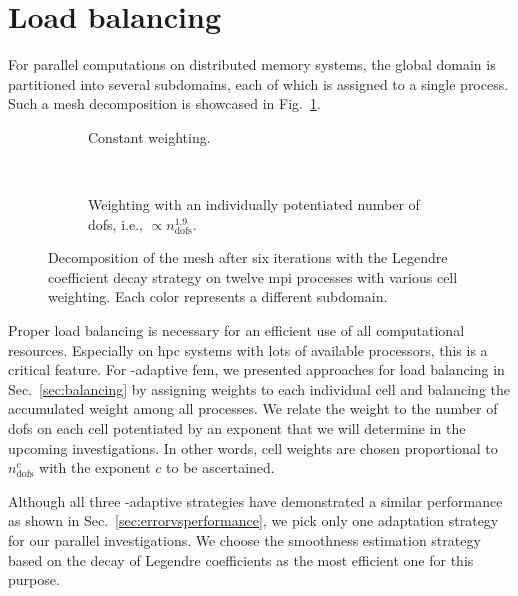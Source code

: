 \section{Load balancing}
\label{sec:heuristics}


For parallel computations on distributed memory systems, the global domain is partitioned into several subdomains, each of which is assigned to a single process. Such a mesh decomposition is showcased in Fig.~\ref{fig:decomposition}.

\begin{figure}
\centering
\begin{subfigure}{1\textwidth}
  \centering
  
  \caption{Constant weighting.}
\end{subfigure}
\vspace{1em} \\
\begin{subfigure}{1\textwidth}
  \centering
  
  \caption{Weighting with an individually potentiated number of \glspl{dof}, i.e., $\propto n_\text{dofs}^{1.9}$.}
\end{subfigure}
\caption[Decomposition of the mesh with various cell weighting.]{Decomposition of the mesh after six iterations with the Legendre coefficient decay strategy on twelve \gls{mpi} processes with various cell weighting. Each color represents a different subdomain.}
\label{fig:decomposition}
\end{figure}

Proper load balancing is necessary for an efficient use of all computational resources. Especially on \gls{hpc} systems with lots of available processors, this is a critical feature. For \hp-adaptive \gls{fem}, we presented approaches for load balancing in Sec.~\ref{sec:balancing} by assigning weights to each individual cell and balancing the accumulated weight among all processes. We relate the weight to the number of \glspl{dof} on each cell potentiated by an exponent that we will determine in the upcoming investigations. In other words, cell weights are chosen proportional to $n_\text{dofs}^c$ with the exponent $c$ to be ascertained.

Although all three \hp-adaptive strategies have demonstrated a similar performance as shown in Sec.~\ref{sec:errorvsperformance}, we pick only one adaptation strategy for our parallel investigations. We choose the smoothness estimation strategy based on the decay of Legendre coefficients as the most efficient one for this purpose.

